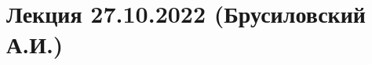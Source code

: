 \documentclass[main.tex]{subfiles}
\begin{document}
\section{Лекция 27.10.2022 (Брусиловский А.И.)}
\end{document}
